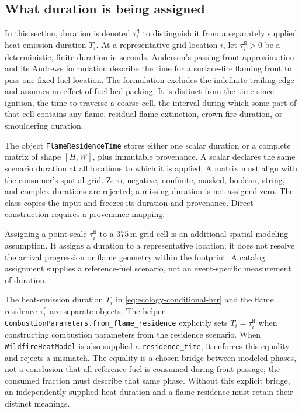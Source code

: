\documentclass[11pt,a4paper]{article}
\begin{document}
\subsection{What duration is being assigned}

In this section, duration is denoted $\tau_i^{\mathrm{fl}}$ to distinguish
it from a separately supplied heat-emission duration $T_i$.
At a representative grid location $i$, let $\tau_i^{\mathrm{fl}}>0$ be a deterministic, finite
duration in seconds. Anderson's passing-front approximation and its Andrews
formulation describe the time for a surface-fire flaming front to pass one
fixed fuel location. The formulation excludes the indefinite trailing edge and
assumes no effect of fuel-bed packing.\cite{anderson1969,andrews2018}
It is distinct from the time since ignition, the time to traverse a coarse
cell, the interval during which some part of that cell contains any flame,
residual-flame extinction, crown-fire duration, or smouldering duration.

The object \texttt{FlameResidenceTime} stores either one scalar duration or a
complete matrix of shape $[H,W]$, plus immutable provenance. A scalar declares
the same scenario duration at all locations to which it is applied. A matrix
must align with the consumer's spatial grid. Zero, negative, nonfinite, masked,
boolean, string, and complex durations are rejected; a missing duration is not
assigned zero. The class copies the input and freezes its duration and
provenance. Direct construction requires a provenance mapping.

Assigning a point-scale $\tau_i^{\mathrm{fl}}$ to a $375\,\mathrm{m}$ grid cell is an additional
spatial modeling assumption. It assigns a duration to a representative
location; it does not resolve the arrival progression or flame geometry within
the footprint. A catalog assignment supplies a reference-fuel scenario, not an
event-specific measurement of duration.

The heat-emission duration $T_i$ in
\eqref{eq:ecology-conditional-hrr} and the flame residence
$\tau_i^{\mathrm{fl}}$ are separate objects. The helper
\texttt{CombustionParameters.from\_flame\_residence} explicitly sets
$T_i=\tau_i^{\mathrm{fl}}$ when constructing combustion parameters from the
residence scenario. When \texttt{WildfireHeatModel} is also supplied a
\texttt{residence\_time}, it enforces this equality and rejects a mismatch.
The equality is a chosen bridge between modeled phases, not a conclusion that
all reference fuel is consumed during front passage; the consumed fraction
must describe that same phase. Without this explicit bridge, an independently
supplied heat duration and a flame residence must retain their distinct
meanings.
\end{document}
